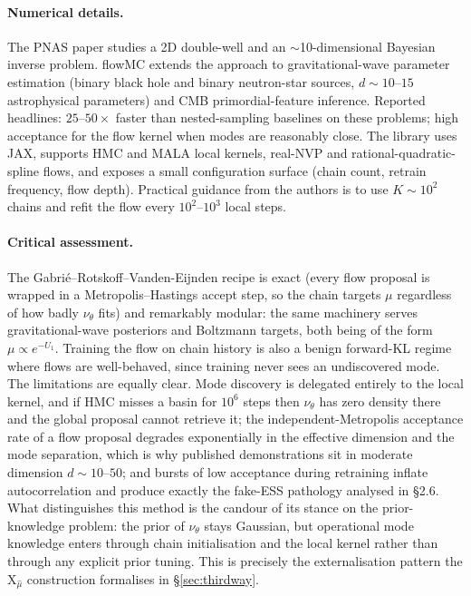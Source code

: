 \documentclass[11pt,letterpaper]{article}
\newcommand{\Xfun}{\mathrm{X}}
\theoremstyle{plain}
\begin{document}
\paragraph{Numerical details.} The PNAS paper studies a 2D double-well and an
$\sim$10-dimensional Bayesian inverse problem. flowMC extends the approach to
gravitational-wave parameter estimation (binary black hole and binary
neutron-star sources, $d\sim 10$--$15$ astrophysical parameters) and CMB
primordial-feature inference. Reported headlines: $25$--$50\times$ faster than
nested-sampling baselines on these problems; high acceptance for the flow kernel
when modes are reasonably close. The library uses JAX, supports HMC and MALA
local kernels, real-NVP and rational-quadratic-spline flows, and exposes a small
configuration surface (chain count, retrain frequency, flow depth). Practical
guidance from the authors is to use $K\sim 10^2$ chains and refit the flow every
$10^2$--$10^3$ local steps.

\paragraph{Critical assessment.} The Gabrié--Rotskoff--Vanden-Eijnden recipe
is exact (every flow proposal is wrapped in a Metropolis--Hastings accept
step, so the chain targets $\mu$ regardless of how badly $\nu_\theta$ fits)
and remarkably modular: the same machinery serves gravitational-wave
posteriors and Boltzmann targets, both being of the form $\mu\propto e^{-U_1}$.
Training the flow on chain history is also a benign forward-KL regime where
flows are well-behaved, since training never sees an undiscovered mode. The
limitations are equally clear. Mode discovery is delegated entirely to the
local kernel, and if HMC misses a basin for $10^6$ steps then $\nu_\theta$ has
zero density there and the global proposal cannot retrieve it; the
independent-Metropolis acceptance rate of a flow proposal degrades
exponentially in the effective dimension and the mode separation, which is
why published demonstrations sit in moderate dimension $d\sim 10$--$50$; and
bursts of low acceptance during retraining inflate autocorrelation and
produce exactly the fake-ESS pathology analysed in \S2.6. What distinguishes
this method is the candour of its stance on the prior-knowledge problem: the
prior of $\nu_\theta$ stays Gaussian, but operational mode knowledge enters
through chain initialisation and the local kernel rather than through any
explicit prior tuning. This is precisely the externalisation pattern the
$\Xfun_{\hat\mu}$ construction formalises in \S\ref{sec:thirdway}.
\end{document}
